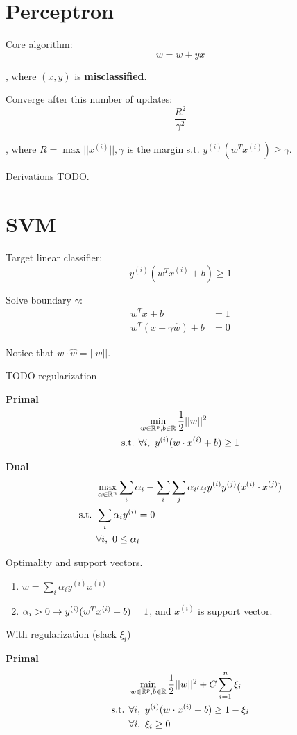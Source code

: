 \documentclass[a4paper]{report}
\begin{document}
\section{Perceptron}
Core algorithm:
$$
w = w+yx
$$

, where $(x, y)$ is \textbf{misclassified}. 

Converge after this number of updates: 
$$
\frac{R^2}{\gamma^2}
$$

, where $R=\max ||x^{(i)}||, \gamma $ is the margin s.t. $y^{(i)}(w^T x^{(i)}) \geq \gamma$. 

Derivations TODO. 

\section{SVM}
Target linear classifier:
$$
y^{(i)} (w^T x^{(i)}+b) \geq 1 
$$

Solve boundary $\gamma$:
\begin{align*}
w^T x + b &=1 \\
w^T(x-\gamma \hat w)+b &= 0
\end{align*}

Notice that $w \cdot \hat w=||w||$.


TODO regularization 

\textbf{Primal}
\begin{align*}
& \min_{w\in \mathbb{R}^p, b\in \mathbb{R}} \frac{1}{2}||w||^2\\ 
\text{s.t. } & \forall i,~ y^{(i)}(w \cdot x^{(i)}+b)\geq 1 
\end{align*}

\textbf{Dual}
\begin{align*}
& \max_{\alpha \in \mathbb{R}^n} \sum_i \alpha_i -\sum_i\sum_j \alpha_i \alpha_j y^{(i)}y^{(j)}(x^{(i)}\cdot x^{(j)}) \\
\text{s.t. } & \sum_i \alpha_i y^{(i)} = 0\\
& \forall i,~ 0\leq\alpha_i 
\end{align*}

Optimality and support vectors. 
\begin{enumerate}
\item $w=\sum_i \alpha_i y^{(i)} x^{(i)}$ 
\item $\alpha_i >0 \rightarrow y^{(i)}(w^T x^{(i)}+b)=1$, and $x^{(i)}$ is support vector.
\end{enumerate}

With regularization (slack $\xi_i$)

\textbf{Primal}
\begin{align*}
& \min_{w\in \mathbb{R}^p, b\in \mathbb{R}} \frac{1}{2}||w||^2+C\sum_{i=1}^n\xi_i\\ 
\text{s.t. } & \forall i,~ y^{(i)}(w \cdot x^{(i)}+b)\geq 1 -\xi_i \\
& \forall i,~\xi_i \geq 0
\end{align*}
\end{document}
